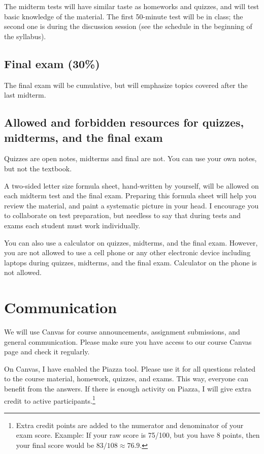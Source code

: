 \documentclass[oneside,11pt]{amsart}
\begin{document}
The midterm tests will have similar taste as homeworks and quizzes, and will test basic knowledge of the material. The first 50-minute test will be in class; the second one is during the discussion session (see the schedule in the beginning of the syllabus).

\subsection{Final exam (30\%)}
The final exam will be cumulative, but will emphasize topics covered after the last midterm.

\subsection*{Allowed and forbidden resources for quizzes, midterms, and the final exam}

Quizzes are open notes, midterms and final are not. You can use your own notes, but not the textbook.

A two-sided letter size formula sheet, hand-written by yourself, will be allowed on each midterm test and the final exam. Preparing this formula sheet will help you review the material, and paint a systematic picture in your head. I encourage you to collaborate on test preparation, but needless to say that during tests and exams each student must work individually.

You can also use a calculator on quizzes, midterms, and the final exam. However, you are not allowed to use a cell phone or any other electronic device including laptops during quizzes, midterms, and the final exam. Calculator on the phone is not allowed.
	

\section{Communication} \label{comm} 

We will use Canvas for course announcements, assignment submissions, and general communication. Please make sure you have access to our course Canvas page and check it regularly.


On Canvas, I have enabled the Piazza tool. Please use it for all questions related to the course material, homework, quizzes, and exams. This way, everyone can benefit from the answers. If there is enough activity on Piazza, I will give extra credit to active participants.\footnote{Extra credit points are added to the numerator and denominator of your exam score. Example: If your raw score is 75/100, but you have 8 points, then your final score would be $83/108 \approx 76.9$.}
\end{document}
